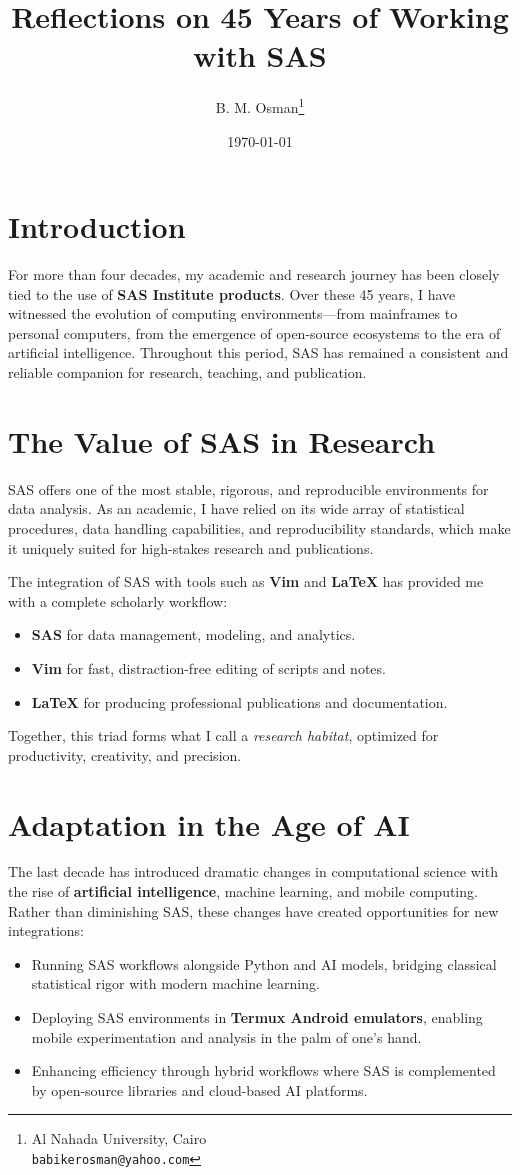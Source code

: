 \documentclass[12pt]{article}
\title{\textcolor{titleColor}{\textbf{\Huge \textbf{ Reflections on 45 Years of Working with SAS }}}}
\author{B. M. Osman\thanks{Al Nahada University, Cairo \\ \texttt{babikerosman@yahoo.com}}}
\date{\today}
\begin{document}
\maketitle


\section*{Introduction}
For more than four decades, my academic and research journey has been closely tied to the use of \textbf{SAS Institute products}. Over these 45 years, I have witnessed the evolution of computing environments---from mainframes to personal computers, from the emergence of open-source ecosystems to the era of artificial intelligence. Throughout this period, SAS has remained a consistent and reliable companion for research, teaching, and publication.

\section{The Value of SAS in Research}
SAS offers one of the most stable, rigorous, and reproducible environments for data analysis. As an academic, I have relied on its wide array of statistical procedures, data handling capabilities, and reproducibility standards, which make it uniquely suited for high-stakes research and publications. 

The integration of SAS with tools such as \textbf{Vim} and \textbf{\LaTeX} has provided me with a complete scholarly workflow:  
\begin{itemize}
  \item \textbf{SAS} for data management, modeling, and analytics.  
  \item \textbf{Vim} for fast, distraction-free editing of scripts and notes.  
  \item \textbf{\LaTeX} for producing professional publications and documentation.  
\end{itemize}

Together, this triad forms what I call a \textit{research habitat}, optimized for productivity, creativity, and precision.

\section{Adaptation in the Age of AI}
The last decade has introduced dramatic changes in computational science with the rise of \textbf{artificial intelligence}, machine learning, and mobile computing. Rather than diminishing SAS, these changes have created opportunities for new integrations:  
\begin{itemize}
  \item Running SAS workflows alongside Python and AI models, bridging classical statistical rigor with modern machine learning.  
  \item Deploying SAS environments in \textbf{Termux Android emulators}, enabling mobile experimentation and analysis in the palm of one’s hand.  
  \item Enhancing efficiency through hybrid workflows where SAS is complemented by open-source libraries and cloud-based AI platforms.  
\end{itemize}
\end{document}

